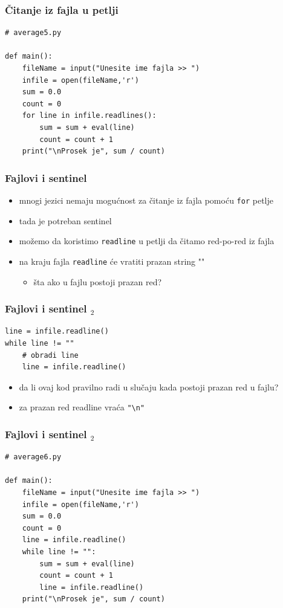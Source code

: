 \documentclass[utf8,compress]{beamer}
\begin{document}
\begin{frame}[fragile]
  \frametitle{Čitanje iz fajla u petlji}
\begin{verbatim}
# average5.py

def main():
    fileName = input("Unesite ime fajla >> ")
    infile = open(fileName,'r')
    sum = 0.0
    count = 0
    for line in infile.readlines():
        sum = sum + eval(line)
        count = count + 1
    print("\nProsek je", sum / count)
\end{verbatim}
\end{frame}

\begin{frame}[fragile]
  \frametitle{Fajlovi i sentinel}
  \begin{itemize}
    \item mnogi jezici nemaju mogućnost za čitanje iz fajla pomoću \texttt{for} petlje
    \item tada je potreban sentinel
    \item možemo da koristimo \texttt{readline} u petlji da čitamo red-po-red iz fajla
    \item na kraju fajla \texttt{readline} će vratiti prazan string ""
    \begin{itemize}
      \item šta ako u fajlu postoji prazan red?
    \end{itemize}
  \end{itemize}
\end{frame}

\begin{frame}[fragile]
  \frametitle{Fajlovi i sentinel $_2$}
\begin{verbatim}
line = infile.readline()
while line != ""
    # obradi line
    line = infile.readline()
\end{verbatim}
  \begin{itemize}
    \item da li ovaj kod pravilno radi u slučaju kada postoji prazan red u fajlu?
    \item za prazan red readline vraća \texttt{"\textbackslash n"}
  \end{itemize}
\end{frame}

\begin{frame}[fragile]
  \frametitle{Fajlovi i sentinel $_2$}
\begin{verbatim}
# average6.py

def main():
    fileName = input("Unesite ime fajla >> ")
    infile = open(fileName,'r')
    sum = 0.0
    count = 0
    line = infile.readline()
    while line != "":
        sum = sum + eval(line)
        count = count + 1
        line = infile.readline()
    print("\nProsek je", sum / count)
\end{verbatim}
\end{frame}
\end{document}
